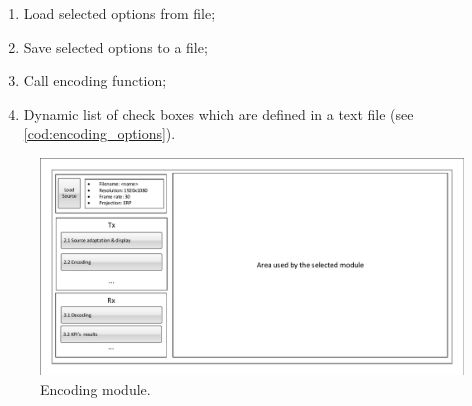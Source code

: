\documentclass{article}
\begin{document}
\begin{enumerate}
    \item Load selected options from file;

    \item Save selected options to a file;

    \item Call encoding function;

    \item Dynamic list of check boxes which are defined in a text file (see \cref{cod:encoding_options}).
\end{enumerate}

\begin{figure}[htbp]
    \centering
    \includegraphics[page=3,width=1\textwidth]{Drawings.pdf}
    \caption{Encoding module.}
    \label{fig:encoding_module}
\end{figure}



\end{document}

